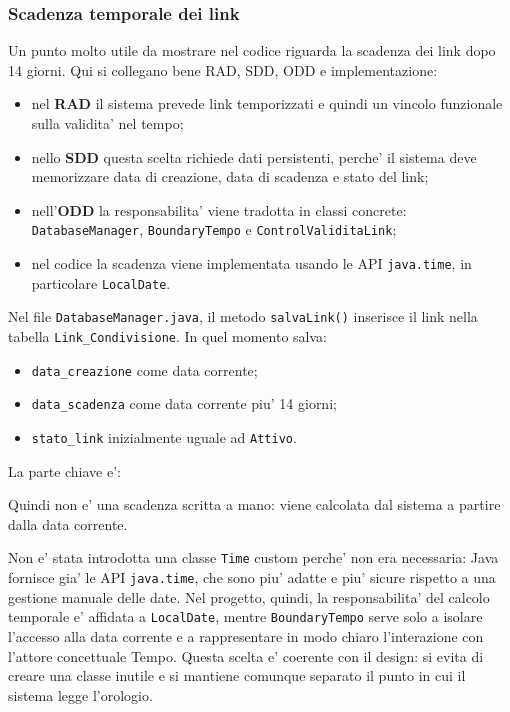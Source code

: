 ﻿\documentclass[11pt,a4paper]{article}
\newcommand{\doc}[1]{\textbf{#1}}
\begin{document}
\subsubsection{Scadenza temporale dei link}

Un punto molto utile da mostrare nel codice riguarda la scadenza dei link dopo 14 giorni.
Qui si collegano bene RAD, SDD, ODD e implementazione:
\begin{itemize}
  \item nel \doc{RAD} il sistema prevede link temporizzati e quindi un vincolo funzionale
  sulla validita' nel tempo;
  \item nello \doc{SDD} questa scelta richiede dati persistenti, perche' il sistema deve
  memorizzare data di creazione, data di scadenza e stato del link;
  \item nell'\doc{ODD} la responsabilita' viene tradotta in classi concrete:
  \texttt{DatabaseManager}, \texttt{BoundaryTempo} e \texttt{ControlValiditaLink};
  \item nel codice la scadenza viene implementata usando le API \texttt{java.time}, in
  particolare \texttt{LocalDate}.
\end{itemize}

Nel file \texttt{DatabaseManager.java}, il metodo \texttt{salvaLink()} inserisce il link
nella tabella \texttt{Link\_Condivisione}. In quel momento salva:
\begin{itemize}
  \item \texttt{data\_creazione} come data corrente;
  \item \texttt{data\_scadenza} come data corrente piu' 14 giorni;
  \item \texttt{stato\_link} inizialmente uguale ad \texttt{Attivo}.
\end{itemize}

La parte chiave e':
\begin{center}
\end{center}
Quindi non e' una scadenza scritta a mano: viene calcolata dal sistema a partire dalla
data corrente.

Non e' stata introdotta una classe \texttt{Time} custom perche' non era necessaria:
Java fornisce gia' le API \texttt{java.time}, che sono piu' adatte e piu' sicure rispetto
a una gestione manuale delle date. Nel progetto, quindi, la responsabilita' del calcolo
temporale e' affidata a \texttt{LocalDate}, mentre \texttt{BoundaryTempo} serve solo a
isolare l'accesso alla data corrente e a rappresentare in modo chiaro l'interazione con
l'attore concettuale Tempo. Questa scelta e' coerente con il design: si evita di creare
una classe inutile e si mantiene comunque separato il punto in cui il sistema legge
l'orologio.
\end{document}
